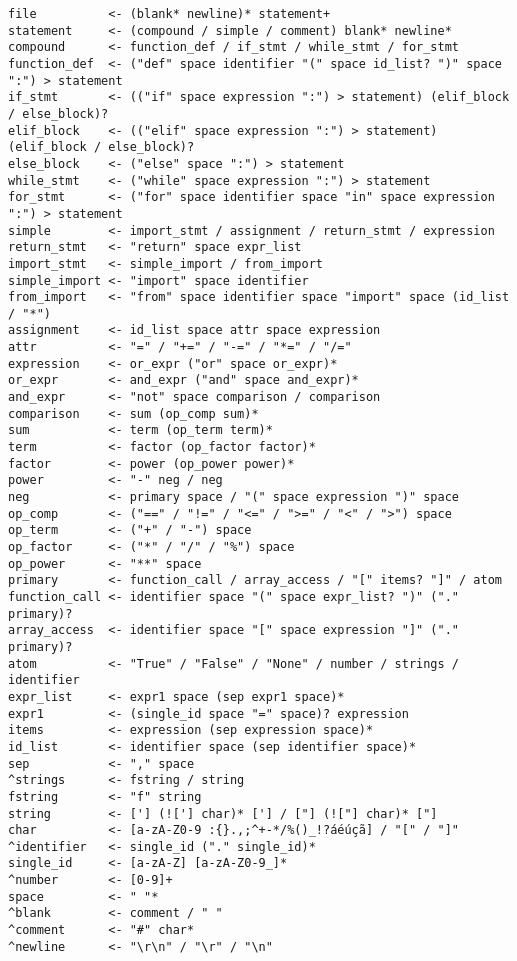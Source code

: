 \begin{verbatim}
file          <- (blank* newline)* statement+
statement     <- (compound / simple / comment) blank* newline*
compound      <- function_def / if_stmt / while_stmt / for_stmt
function_def  <- ("def" space identifier "(" space id_list? ")" space ":") > statement
if_stmt       <- (("if" space expression ":") > statement) (elif_block / else_block)?
elif_block    <- (("elif" space expression ":") > statement) (elif_block / else_block)?
else_block    <- ("else" space ":") > statement
while_stmt    <- ("while" space expression ":") > statement
for_stmt      <- ("for" space identifier space "in" space expression ":") > statement
simple        <- import_stmt / assignment / return_stmt / expression
return_stmt   <- "return" space expr_list
import_stmt   <- simple_import / from_import
simple_import <- "import" space identifier
from_import   <- "from" space identifier space "import" space (id_list / "*")
assignment    <- id_list space attr space expression
attr          <- "=" / "+=" / "-=" / "*=" / "/="
expression    <- or_expr ("or" space or_expr)*
or_expr       <- and_expr ("and" space and_expr)*
and_expr      <- "not" space comparison / comparison
comparison    <- sum (op_comp sum)*
sum           <- term (op_term term)* 
term          <- factor (op_factor factor)*
factor        <- power (op_power power)*
power         <- "-" neg / neg
neg           <- primary space / "(" space expression ")" space
op_comp       <- ("==" / "!=" / "<=" / ">=" / "<" / ">") space
op_term       <- ("+" / "-") space
op_factor     <- ("*" / "/" / "%") space
op_power      <- "**" space
primary       <- function_call / array_access / "[" items? "]" / atom
function_call <- identifier space "(" space expr_list? ")" ("." primary)?
array_access  <- identifier space "[" space expression "]" ("." primary)?
atom          <- "True" / "False" / "None" / number / strings / identifier
expr_list     <- expr1 space (sep expr1 space)*
expr1         <- (single_id space "=" space)? expression
items         <- expression (sep expression space)*
id_list       <- identifier space (sep identifier space)*
sep           <- "," space
^strings      <- fstring / string
fstring       <- "f" string
string        <- ['] (!['] char)* ['] / ["] (!["] char)* ["]
char          <- [a-zA-Z0-9 :{}.,;^+-*/%()_!?áéúçã] / "[" / "]"
^identifier   <- single_id ("." single_id)*
single_id     <- [a-zA-Z] [a-zA-Z0-9_]*
^number       <- [0-9]+
space         <- " "*
^blank        <- comment / " "
^comment      <- "#" char*
^newline      <- "\r\n" / "\r" / "\n"
\end{verbatim}
